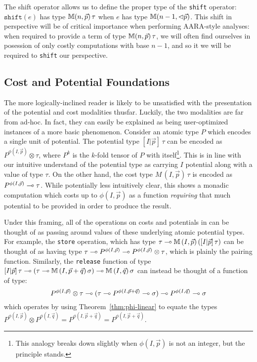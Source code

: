 The shift operator allows us to define the proper type of the \texttt{shift} operator: $\texttt{shift}(e)$ has type $\mathbb{M} (n,\vec{p}) \, \tau$ when $e$ has type $\mathbb{M} (n-1,\lhd\vec{p})$. This shift in perspective will be of critical importance when performing AARA-style analyses: when required to provide a term of type $\mathbb{M} (n,\vec{p}) \, \tau$, we will often find ourselves in posession of only costly computations with base $n-1$, and so it we will be required to \texttt{shift} our perspective.

\subsection{Cost and Potential Foundations}
The more logically-inclined reader is likely to be unsatisfied with the presentation of the potential and cost modalities thusfar. Luckily, the two modalities are far from ad-hoc. In fact, they can easily be explained as being user-optimized instances of a more basic phenomenon. Consider an atomic type $P$ which encodes a single unit of potential. The potential type $[I|\vec{p}] \, \tau$ can be encoded as $P^{\phi(I,\vec{p})} \otimes \tau$, where $P^k$ is the $k$-fold tensor of $P$ with itself\footnote{
This analogy breaks down slightly when $\phi(I,\vec{p})$ is not an integer, but the principle stands.
}. This is in line with our intuitive understand of the potential type as carrying $I$ potential along with a value of type $\tau$. On the other hand, the cost type $M \,(I,\vec{p}) \, \tau$ is encoded as $P^{\phi(I,\vec{p})} \multimap \tau$. While potentially less intuitively clear, this shows a monadic computation which costs up to $\phi(I,\vec{p})$ as a function \textit{requiring} that much potential to be provided in order to produce the result.

Under this framing, all of the operations on costs and potentials in \dlambdaamor can be thought of as passing around values of these underlying atomic potential types. For example, the \texttt{store} operation, which has type $\tau \multimap \mathbb{M} \, (I,\vec{p}) \, ([I|\vec{p}] \, \tau)$ can be thought of as having type $\tau \multimap P^{\phi(I,\vec{p})} \multimap P^{\phi(I,\vec{p})} \otimes \tau$, which is plainly the pairing function. Similarly, the \texttt{release} function of type $[I|\vec{p}] \, \tau \multimap (\tau \multimap \mathbb{M} \, (I,\vec{p} + \vec{q}) \, \sigma) \multimap \mathbb{M} \, (I,\vec{q})\, \sigma$ can instead be thought of a function of type:
$$
P^{\phi(I,\vec{p})} \otimes \tau \multimap (\tau \multimap P^{\phi(I,\vec{p} + \vec{q})} \multimap \sigma) \multimap P^{\phi(I,\vec{q})} \multimap \sigma
$$
which operates by using Theorem~\ref{thm:phi-linear} to equate the types $P^{\phi(I,\vec{p})} \otimes P^{\phi(I,\vec{q})} = P^{\phi(I,\vec{p} + \vec{q})} = P^{\phi(I,\vec{p} + \vec{q})}$.


